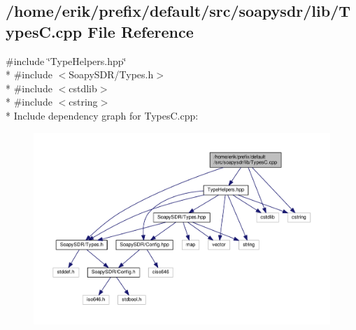 \subsection{/home/erik/prefix/default/src/soapysdr/lib/\+TypesC.cpp File Reference}
\label{TypesC_8cpp}
{\ttfamily \#include \char`\"{}Type\+Helpers.\+hpp\char`\"{}}\\*
{\ttfamily \#include $<$Soapy\+S\+D\+R/\+Types.\+h$>$}\\*
{\ttfamily \#include $<$cstdlib$>$}\\*
{\ttfamily \#include $<$cstring$>$}\\*
Include dependency graph for Types\+C.\+cpp\+:
\nopagebreak
\begin{figure}[H]
\begin{center}
\leavevmode
\includegraphics[width=350pt]{d5/d57/TypesC_8cpp__incl}
\end{center}
\end{figure}
